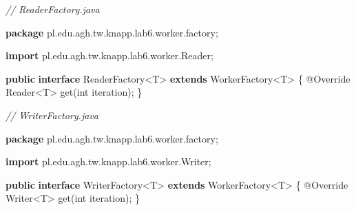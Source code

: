 \documentclass[11pt]{article}
\newenvironment{Shaded}{}{}
\newcommand{\KeywordTok}[1]{\textcolor[rgb]{0.00,0.44,0.13}{\textbf{{#1}}}}
\newcommand{\DataTypeTok}[1]{\textcolor[rgb]{0.56,0.13,0.00}{{#1}}}
\newcommand{\CommentTok}[1]{\textcolor[rgb]{0.38,0.63,0.69}{\textit{{#1}}}}
\newcommand{\FunctionTok}[1]{\textcolor[rgb]{0.02,0.16,0.49}{{#1}}}
\newcommand{\NormalTok}[1]{{#1}}
\newcommand{\ImportTok}[1]{{#1}}
\newcommand{\OperatorTok}[1]{\textcolor[rgb]{0.40,0.40,0.40}{{#1}}}
\newcommand{\BuiltInTok}[1]{{#1}}
\newcommand{\AttributeTok}[1]{\textcolor[rgb]{0.49,0.56,0.16}{{#1}}}
\begin{document}
\begin{Shaded}
\begin{Highlighting}[]
\CommentTok{// ReaderFactory.java}

\KeywordTok{package}\ImportTok{ pl}\OperatorTok{.}\ImportTok{edu}\OperatorTok{.}\ImportTok{agh}\OperatorTok{.}\ImportTok{tw}\OperatorTok{.}\ImportTok{knapp}\OperatorTok{.}\ImportTok{lab6}\OperatorTok{.}\ImportTok{worker}\OperatorTok{.}\ImportTok{factory}\OperatorTok{;}

\KeywordTok{import} \ImportTok{pl}\OperatorTok{.}\ImportTok{edu}\OperatorTok{.}\ImportTok{agh}\OperatorTok{.}\ImportTok{tw}\OperatorTok{.}\ImportTok{knapp}\OperatorTok{.}\ImportTok{lab6}\OperatorTok{.}\ImportTok{worker}\OperatorTok{.}\ImportTok{Reader}\OperatorTok{;}

\KeywordTok{public} \KeywordTok{interface}\NormalTok{ ReaderFactory}\OperatorTok{\textless{}}\NormalTok{T}\OperatorTok{\textgreater{}} \KeywordTok{extends}\NormalTok{ WorkerFactory}\OperatorTok{\textless{}}\NormalTok{T}\OperatorTok{\textgreater{}} \OperatorTok{\{}
    \AttributeTok{@Override}
    \BuiltInTok{Reader}\OperatorTok{\textless{}}\NormalTok{T}\OperatorTok{\textgreater{}} \FunctionTok{get}\OperatorTok{(}\DataTypeTok{int}\NormalTok{ iteration}\OperatorTok{);}
\OperatorTok{\}}
\end{Highlighting}
\end{Shaded}

\begin{Shaded}
\begin{Highlighting}[]
\CommentTok{// WriterFactory.java}

\KeywordTok{package}\ImportTok{ pl}\OperatorTok{.}\ImportTok{edu}\OperatorTok{.}\ImportTok{agh}\OperatorTok{.}\ImportTok{tw}\OperatorTok{.}\ImportTok{knapp}\OperatorTok{.}\ImportTok{lab6}\OperatorTok{.}\ImportTok{worker}\OperatorTok{.}\ImportTok{factory}\OperatorTok{;}

\KeywordTok{import} \ImportTok{pl}\OperatorTok{.}\ImportTok{edu}\OperatorTok{.}\ImportTok{agh}\OperatorTok{.}\ImportTok{tw}\OperatorTok{.}\ImportTok{knapp}\OperatorTok{.}\ImportTok{lab6}\OperatorTok{.}\ImportTok{worker}\OperatorTok{.}\ImportTok{Writer}\OperatorTok{;}

\KeywordTok{public} \KeywordTok{interface}\NormalTok{ WriterFactory}\OperatorTok{\textless{}}\NormalTok{T}\OperatorTok{\textgreater{}} \KeywordTok{extends}\NormalTok{ WorkerFactory}\OperatorTok{\textless{}}\NormalTok{T}\OperatorTok{\textgreater{}} \OperatorTok{\{}
    \AttributeTok{@Override}
    \BuiltInTok{Writer}\OperatorTok{\textless{}}\NormalTok{T}\OperatorTok{\textgreater{}} \FunctionTok{get}\OperatorTok{(}\DataTypeTok{int}\NormalTok{ iteration}\OperatorTok{);}
\OperatorTok{\}}
\end{Highlighting}
\end{Shaded}
\end{document}
